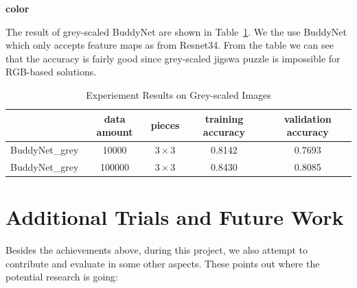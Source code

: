\documentclass{article}
\begin{document}
\textbf{color}

The result of grey-scaled BuddyNet are shown in Table~\ref{tab:expgrey}. We the use BuddyNet which only accepts feature maps as from Resnet34. From the table we can see that the accuracy is fairly good since grey-scaled jigswa puzzle is impossible for RGB-based solutions.

\begin{table}
    \caption{Experiement Results on Grey-scaled Images}
    \centering
    \label{tab:expgrey}
    \begin{tabular}{c|c|c|c|c}
        \hline
        & data amount & pieces & training accuracy & validation accuracy\\
        \hline
        BuddyNet\_grey & 10000 & $3\times 3$ & 0.8142 & 0.7693\\
        \hline
        BuddyNet\_grey & 100000 & $3\times 3$ & 0.8430 & 0.8085\\
        \hline
    \end{tabular}
\end{table}

\section{Additional Trials and Future Work}

Besides the achievements above, during this project, we also attempt to contribute and evaluate in some other aspects. These points out where the potential research is going:
\end{document}
